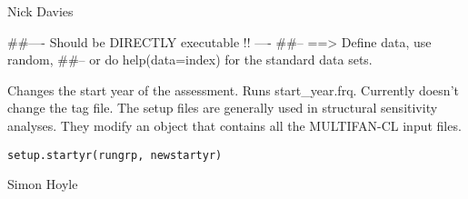 \documentclass[a4paper]{book}
\begin{document}
%
\begin{Arguments}
\begin{ldescription}
\item[\code{rungrp}] 


\item[\code{sourcedir}] 


\item[\code{PScatch}] 


\item[\code{spp}] 


\end{ldescription}
\end{Arguments}
%
\begin{Author}\relax

Nick Davies
\end{Author}
%
\begin{Examples}
\begin{ExampleCode}
##---- Should be DIRECTLY executable !! ----
##-- ==>  Define data, use random,
##--	or do  help(data=index)  for the standard data sets.

\end{ExampleCode}
\end{Examples}
%
\begin{Description}\relax

Changes the start year of the assessment. Runs start\_year.frq. Currently doesn't change the tag file. 
The setup files are generally used in structural sensitivity analyses. They modify an object that contains all the MULTIFAN-CL input files. 
\end{Description}
%
\begin{Usage}
\begin{verbatim}
setup.startyr(rungrp, newstartyr)
\end{verbatim}
\end{Usage}
%
\begin{Arguments}
\begin{ldescription}
\item[\code{rungrp}] 


\item[\code{newstartyr}] 


\end{ldescription}
\end{Arguments}
%
\begin{Author}\relax

Simon Hoyle
\end{Author}
\end{document}
